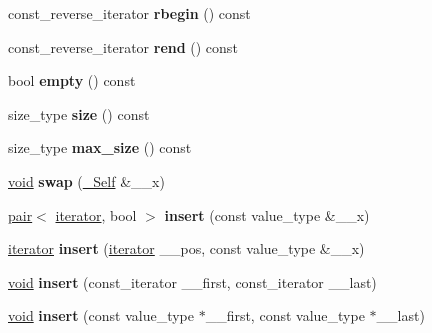\begin{DoxyCompactItemize}
\mbox{\label{classset_a97d56cabb8af06eedcbaed50c2d5fb83}} 
const\+\_\+reverse\+\_\+iterator {\bfseries rbegin} () const
\item 
\mbox{\label{classset_a557c42d15bd99f23ecc0724d4130fa92}} 
const\+\_\+reverse\+\_\+iterator {\bfseries rend} () const
\item 
\mbox{\label{classset_a5217530c478d26d81c0a72465e964bff}} 
bool {\bfseries empty} () const
\item 
\mbox{\label{classset_ae1202b4dbfa38fa9991975e2f8f6c5dc}} 
size\+\_\+type {\bfseries size} () const
\item 
\mbox{\label{classset_a3f3d228fef866fda90b4e314e0de122d}} 
size\+\_\+type {\bfseries max\+\_\+size} () const
\item 
\mbox{\label{classset_ad24467dd7e09610db47016305d6b5617}} 
\hyperlink{interfacevoid}{void} {\bfseries swap} (\hyperlink{classset}{\+\_\+\+Self} \&\+\_\+\+\_\+x)
\item 
\mbox{\label{classset_a90bef3ebc1fa511ebcc4153e6a7d67d7}} 
\hyperlink{structpair}{pair}$<$ \hyperlink{structiterator}{iterator}, bool $>$ {\bfseries insert} (const value\+\_\+type \&\+\_\+\+\_\+x)
\item 
\mbox{\label{classset_a4b15c183176088ca4edda7a3c7905671}} 
\hyperlink{structiterator}{iterator} {\bfseries insert} (\hyperlink{structiterator}{iterator} \+\_\+\+\_\+pos, const value\+\_\+type \&\+\_\+\+\_\+x)
\item 
\mbox{\label{classset_a7155d17c35d5d0a0d635100cc52b1664}} 
\hyperlink{interfacevoid}{void} {\bfseries insert} (const\+\_\+iterator \+\_\+\+\_\+first, const\+\_\+iterator \+\_\+\+\_\+last)
\item 
\mbox{\label{classset_aef6025de65406f72d35e85f5b686b0c7}} 
\hyperlink{interfacevoid}{void} {\bfseries insert} (const value\+\_\+type $\ast$\+\_\+\+\_\+first, const value\+\_\+type $\ast$\+\_\+\+\_\+last)
\item 
\mbox{\label{classset_a5cd2e838cef13a0ba4254d571f2f005b}} 

\end{DoxyCompactItemize}
